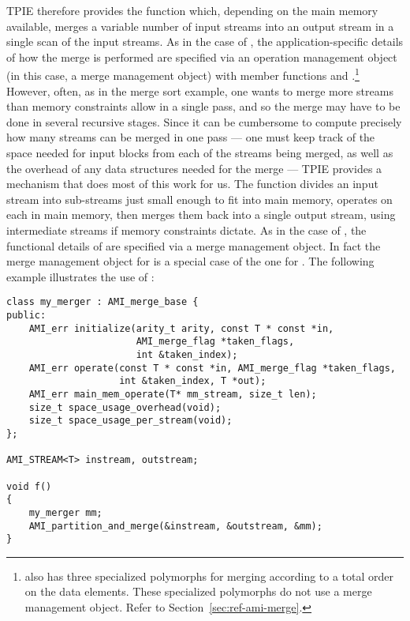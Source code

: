 TPIE therefore provides the function 
which, depending on the main memory available, merges a
variable number of input streams into an output stream in a
single scan of the input streams. As in the case of
, the application-specific details of how the merge
is performed are specified via an operation management
object (in this case, a  merge management object)
with member functions  and
.\footnote{%
    also has three specialized polymorphs
   for merging according to a total order on the data
   elements. These specialized polymorphs do not use a merge
   management object. Refer to
   Section~\ref{sec:ref-ami-merge}.} 
However, often, as in the merge sort example, one wants to
merge more streams than memory constraints allow in a single
pass, and so the merge may have to be done in several recursive
stages.
Since it can be cumbersome to compute precisely how
many streams can be merged in one pass --- one must keep
track of the space needed for input blocks from each of the
streams being merged, as well as the overhead of any data
structures needed for the merge --- TPIE provides a
mechanism that does most of this work for us. The
function  divides an
input stream into sub-streams just small enough to fit into
main memory, operates on each in main memory, then merges
them back into a single output stream, using intermediate
streams if memory constraints dictate. As in the case of
, the functional details of
 are specified via a
merge management object. In fact the merge management object
for  is a special case of the one for
. The following example
illustrates the use of :

\begin{verbatim}
class my_merger : AMI_merge_base {
public:
    AMI_err initialize(arity_t arity, const T * const *in,
                       AMI_merge_flag *taken_flags,
                       int &taken_index);
    AMI_err operate(const T * const *in, AMI_merge_flag *taken_flags,
                    int &taken_index, T *out);
    AMI_err main_mem_operate(T* mm_stream, size_t len);
    size_t space_usage_overhead(void);
    size_t space_usage_per_stream(void);
};

AMI_STREAM<T> instream, outstream;

void f() 
{
    my_merger mm;    
    AMI_partition_and_merge(&instream, &outstream, &mm);
}
\end{verbatim}

